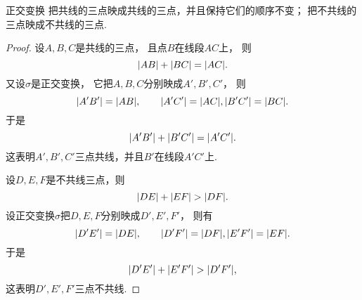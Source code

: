 \begin{property}\label{theorem:平面的正交变换.正交变换保持共线性}
正交变换
把共线的三点映成共线的三点，并且保持它们的顺序不变；
把不共线的三点映成不共线的三点.
\begin{proof}
设\(A,B,C\)是共线的三点，
且点\(B\)在线段\(AC\)上，
则\begin{equation*}
	\abs{AB} + \abs{BC}
	= \abs{AC}.
\end{equation*}
又设\(\sigma\)是正交变换，
它把\(A,B,C\)分别映成\(A',B',C'\)，
则\begin{equation*}
	\abs{A'B'}
	= \abs{AB},
	\qquad
	\abs{A'C'}
	= \abs{AC},
	\abs{B'C'}
	= \abs{BC}.
\end{equation*}
于是\begin{equation*}
	\abs{A'B'}
	+ \abs{B'C'}
	= \abs{A'C'}.
\end{equation*}
这表明\(A',B',C'\)三点共线，并且\(B'\)在线段\(A'C'\)上.

设\(D,E,F\)是不共线三点，则\begin{equation*}
	\abs{DE}
	+ \abs{EF}
	> \abs{DF}.
\end{equation*}
设正交变换\(\sigma\)把\(D,E,F\)分别映成\(D',E',F'\)，
则有\begin{equation*}
	\abs{D'E'}
	= \abs{DE},
	\qquad
	\abs{D'F'}
	= \abs{DF},
	\abs{E'F'}
	= \abs{EF}.
\end{equation*}
于是\begin{equation*}
	\abs{D'E'}
	+ \abs{E'F'}
	> \abs{D'F'},
\end{equation*}
这表明\(D',E',F'\)三点不共线.
\end{proof}
\end{property}

